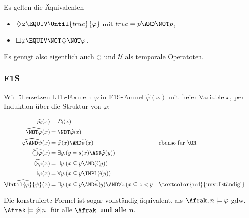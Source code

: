 Es gelten die Äquivalenten
\begin{itemize}
  \item $\diamondsuit \varphi \EQUIV \Until{true}{\varphi}$ mit $true = p\AND\NOT p$,
  \item $\square \varphi \EQUIV \NOT\diamondsuit\NOT \varphi$.
\end{itemize}

Es genügt also eigentlich auch $\bigcirc$ und $\mathcal{U}$ als temporale Operatoten.


\subsubsection{F1S}

Wir übersetzen LTL-Formeln $\varphi$ in F1S-Formel $\widehat{\varphi}(x)$ mit freier
Variable $x$, per Induktion über die Struktur von $\varphi$:

\begin{align*}
  \widehat{p_i}(x) &= P_i(x) \\
  \widehat{\NOT\varphi}(x) &= \NOT\widehat{\varphi}(x) \\
  \widehat{\varphi\AND\psi}(x) &= \widehat{\varphi}(x)\AND\widehat{\psi}(x) && \text{ebenso für $\OR$} \\
  \widehat{\bigcirc\varphi}(x) &= \exists y.(y=s(x) \AND \widehat{\varphi}(y)) \\
  \widehat{\diamondsuit\varphi}(x) &= \exists y.(x\subseteq y \AND \widehat{\varphi}(y)) \\
  \widehat{\square\varphi}(x) &= \forall y.(x\subseteq y \IMPL \widehat{\varphi}(y)) \\
  \widehat{\Until{\varphi}{\psi}}(x) &= \exists y.(x\subseteq y \AND \widehat{\psi}(y) \AND \forall z.(x\subseteq z < y && \text{\textcolor{red}{unvollständig!}}
\end{align*}

Die konstruierte Formel ist sogar vollständig äquivalent, als
$\Afrak,n\models\varphi$ gdw. $\Afrak\models\hat{\varphi}[n]$ für alle
$\Afrak$ \textbf{und alle $\mathbf{n}$}.
